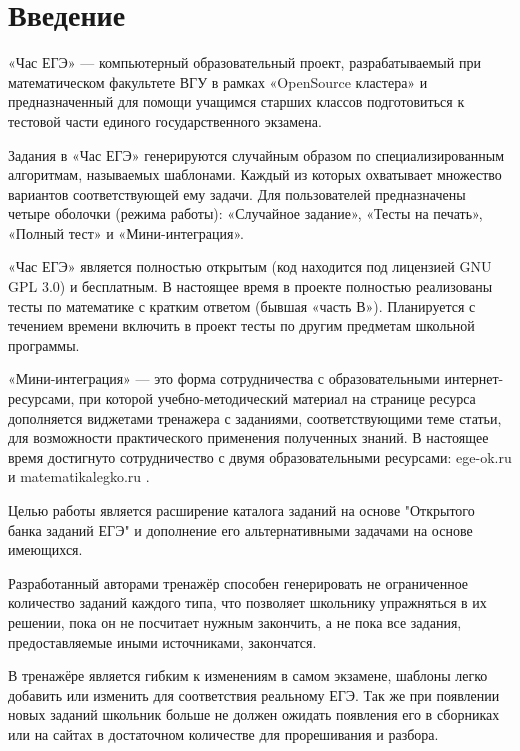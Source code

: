

\section{Введение}%
«Час ЕГЭ» — компьютерный образовательный проект, разрабатываемый при математическом факультете ВГУ в рамках «OpenSource кластера» и предназначенный для помощи учащимся старших классов подготовиться к тестовой части единого государственного экзамена.

Задания в «Час ЕГЭ» генерируются случайным образом по специализированным алгоритмам, называемых шаблонами. Каждый из которых охватывает множество вариантов соответствующей ему задачи. Для пользователей предназначены четыре оболочки (режима работы): «Случайное задание», «Тесты на печать», «Полный тест» и «Мини-интеграция».

«Час ЕГЭ» является полностью открытым (код находится под лицензией GNU GPL 3.0) и бесплатным. В настоящее время в проекте полностью реализованы тесты по математике с кратким ответом (бывшая «часть В»). Планируется с течением времени включить в проект тесты по другим предметам школьной программы.

«Мини-интеграция» — это форма сотрудничества с образовательными интернет-ресурсами, при которой учебно-методический материал на странице ресурса дополняется виджетами тренажера с заданиями, соответствующими теме статьи, для возможности практического применения полученных знаний. В настоящее время достигнуто сотрудничество с двумя образовательными ресурсами: ege-ok.ru и matematikalegko.ru .

Целью работы является расширение каталога заданий на основе "Открытого банка заданий ЕГЭ" и дополнение его альтернативными задачами	на основе имеющихся.

Разработанный авторами тренажёр способен генерировать не ограниченное количество заданий каждого типа, что позволяет школьнику упражняться в их решении, пока он не посчитает нужным закончить, а не пока все задания, предоставляемые иными источниками, закончатся.

В тренажёре является гибким к изменениям в самом экзамене, шаблоны легко добавить или изменить для соответствия реальному ЕГЭ. Так же при появлении новых заданий школьник больше не должен ожидать появления его в сборниках или на сайтах в достаточном количестве для прорешивания и разбора.


